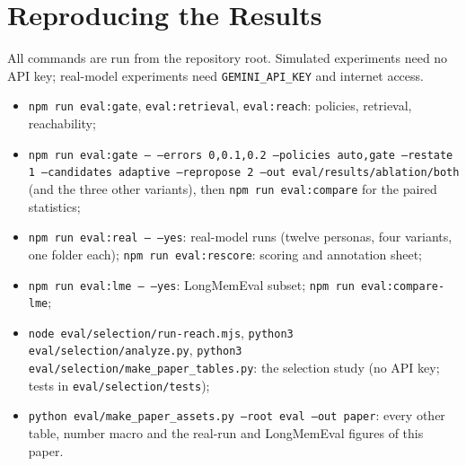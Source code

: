 \IfFileExists{IEEEtran.cls}{\documentclass[journal]{IEEEtran}\def\HAVEIEEE{1}}{\documentclass[10pt,twocolumn]{article}\usepackage[margin=0.7in,columnsep=0.25in]{geometry}}
\begin{document}
\section{Reproducing the Results}
All commands are run from the repository root. Simulated experiments need no API key; real-model experiments need \texttt{GEMINI\_API\_KEY} and internet access.
\begin{itemize}\setlength\itemsep{0pt}
\item \texttt{npm run eval:gate}, \texttt{eval:retrieval}, \texttt{eval:reach}: policies, retrieval, reachability;
\item \texttt{npm run eval:gate -- --errors 0,0.1,0.2 --policies auto,gate --restate 1 --candidates adaptive --repropose 2 --out eval/results/ablation/both} (and the three other variants), then \texttt{npm run eval:compare} for the paired statistics;
\item \texttt{npm run eval:real -- --yes}: real-model runs (twelve personas, four variants, one folder each); \texttt{npm run eval:rescore}: scoring and annotation sheet;
\item \texttt{npm run eval:lme -- --yes}: LongMemEval subset; \texttt{npm run eval:compare-lme};
\item \texttt{node eval/selection/run-reach.mjs}, \texttt{python3 eval/selection/analyze.py}, \texttt{python3 eval/selection/\allowbreak make\_paper\_tables.py}: the selection study (no API key; tests in \texttt{eval/selection/tests});
\item \texttt{python eval/make\_paper\_assets.py --root eval --out paper}: every other table, number macro and the real-run and LongMemEval figures of this paper.
\end{itemize}

\ifdefined\HAVEIEEE\else\fi

\end{document}
